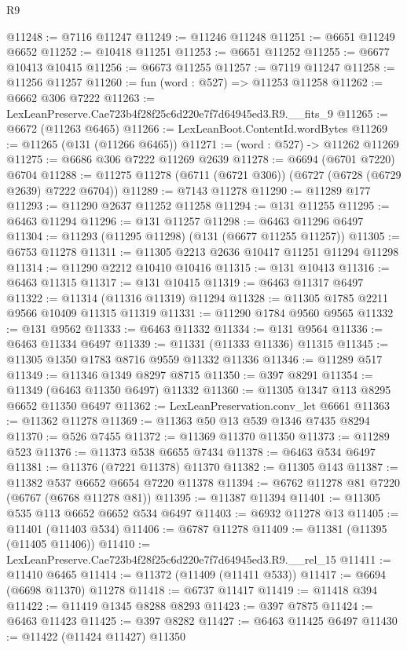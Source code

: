 \begin{lexlean}{R9}
\begin{coremodule}
@11248 := @7116 @11247
@11249 := @11246 @11248
@11251 := @6651 @11249 @6652
@11252 := @10418 @11251
@11253 := @6651 @11252
@11255 := @6677 @10413 @10415
@11256 := @6673 @11255
@11257 := @7119 @11247
@11258 := @11256 @11257
@11260 := fun (word : @527) => @11253 @11258
@11262 := @6662 @306 @7222
@11263 := LexLeanPreserve.Cae723b4f28f25c6d220e7f7d64945ed3.R9.__fits_9
@11265 := @6672 (@11263 @6465)
@11266 := LexLeanBoot.ContentId.wordBytes
@11269 := @11265 (@131 (@11266 @6465))
@11271 := (word : @527) -> @11262 @11269
@11275 := @6686 @306 @7222 @11269 @2639
@11278 := @6694 (@6701 @7220) @6704
@11288 := @11275 @11278 (@6711 (@6721 @306)) (@6727 (@6728 (@6729 @2639) @7222 @6704))
@11289 := @7143 @11278
@11290 := @11289 @177
@11293 := @11290 @2637 @11252 @11258
@11294 := @131 @11255
@11295 := @6463 @11294
@11296 := @131 @11257
@11298 := @6463 @11296 @6497
@11304 := @11293 (@11295 @11298) (@131 (@6677 @11255 @11257))
@11305 := @6753 @11278
@11311 := @11305 @2213 @2636 @10417 @11251 @11294 @11298
@11314 := @11290 @2212 @10410 @10416
@11315 := @131 @10413
@11316 := @6463 @11315
@11317 := @131 @10415
@11319 := @6463 @11317 @6497
@11322 := @11314 (@11316 @11319) @11294
@11328 := @11305 @1785 @2211 @9566 @10409 @11315 @11319
@11331 := @11290 @1784 @9560 @9565
@11332 := @131 @9562
@11333 := @6463 @11332
@11334 := @131 @9564
@11336 := @6463 @11334 @6497
@11339 := @11331 (@11333 @11336) @11315
@11345 := @11305 @1350 @1783 @8716 @9559 @11332 @11336
@11346 := @11289 @517
@11349 := @11346 @1349 @8297 @8715
@11350 := @397 @8291
@11354 := @11349 (@6463 @11350 @6497) @11332
@11360 := @11305 @1347 @113 @8295 @6652 @11350 @6497
@11362 := LexLeanPreservation.conv_let @6661
@11363 := @11362 @11278
@11369 := @11363 @50 @13 @539 @1346 @7435 @8294
@11370 := @526 @7455
@11372 := @11369 @11370 @11350
@11373 := @11289 @523
@11376 := @11373 @538 @6655 @7434
@11378 := @6463 @534 @6497
@11381 := @11376 (@7221 @11378) @11370
@11382 := @11305 @143
@11387 := @11382 @537 @6652 @6654 @7220 @11378
@11394 := @6762 @11278 @81 @7220 (@6767 (@6768 @11278 @81))
@11395 := @11387 @11394
@11401 := @11305 @535 @113 @6652 @6652 @534 @6497
@11403 := @6932 @11278 @13
@11405 := @11401 (@11403 @534)
@11406 := @6787 @11278
@11409 := @11381 (@11395 (@11405 @11406))
@11410 := LexLeanPreserve.Cae723b4f28f25c6d220e7f7d64945ed3.R9.__rel_15
@11411 := @11410 @6465
@11414 := @11372 (@11409 (@11411 @533))
@11417 := @6694 (@6698 @11370) @11278
@11418 := @6737 @11417
@11419 := @11418 @394
@11422 := @11419 @1345 @8288 @8293
@11423 := @397 @7875
@11424 := @6463 @11423
@11425 := @397 @8282
@11427 := @6463 @11425 @6497
@11430 := @11422 (@11424 @11427) @11350

\end{coremodule}
\end{lexlean}
